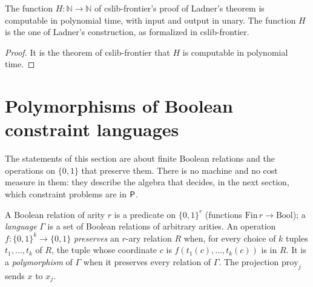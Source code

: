 \begin{theorem}
  \label{thm:structure-reloj-de-ladner}
  \leanok
  The function $H : \mathbb{N} \to \mathbb{N}$ of cslib-frontier's proof of Ladner's theorem is
  computable in polynomial time, with input and output in unary.
  The function $H$ is the one of Ladner's construction, as formalized in cslib-frontier.
  \own{}
\end{theorem}

\begin{proof}
  \leanok
  It is the theorem of cslib-frontier that $H$ is computable in polynomial time.
\end{proof}

\section{Polymorphisms of Boolean constraint languages}
\label{sec:structure-polymorphisms}

The statements of this section are about finite Boolean relations and the operations on
$\{0,1\}$ that preserve them. There is no machine and no cost measure in them: they describe
the algebra that decides, in the next section, which constraint problems are in $\mathsf{P}$.

\begin{definition}
  \label{def:structure-polymorphism}
  \leanok
  A Boolean relation of arity $r$ is a predicate on $\{0,1\}^r$ (functions $\mathrm{Fin}\,r \to
  \mathrm{Bool}$); a \emph{language} $\Gamma$ is a set of Boolean relations of arbitrary arities.
  An operation $f : \{0,1\}^k \to \{0,1\}$ \emph{preserves} an $r$-ary relation $R$ when, for
  every choice of $k$ tuples $t_1, \dots, t_k$ of $R$, the tuple whose coordinate $c$ is
  $f(t_1(c), \dots, t_k(c))$ is in $R$. It is a \emph{polymorphism} of $\Gamma$ when it preserves
  every relation of $\Gamma$. The projection $\mathrm{proy}_j$ sends $x$ to $x_j$.
  \own{}
\end{definition}


